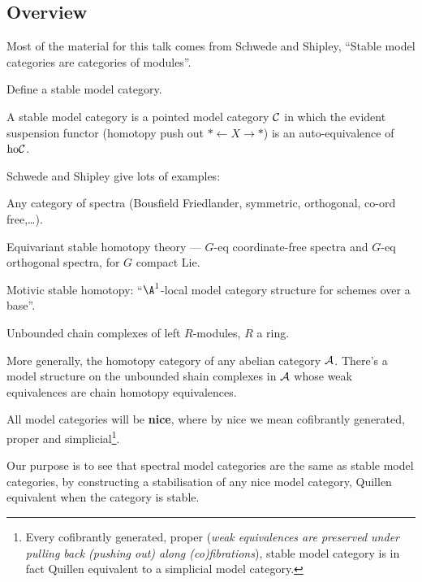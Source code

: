 \begin{MichaelStableModelCats}
\subsection*{Overview}
\begin{itemise}
\item Most of the material for this talk comes from Schwede and Shipley, ``Stable model categories are categories of modules''.
\item Define a stable model category.
\begin{itemise}
\item A stable model category is a pointed model category $\mathcal{C}$ in which the evident suspension functor (homotopy push out $\ast\leftarrow X\rightarrow\ast$) is an auto-equivalence of $\textup{ho}\mathcal{C}$.
\end{itemise}
\item Schwede and Shipley give lots of examples:
\begin{itemise}
\item Any category of spectra (Bousfield Friedlander, symmetric, orthogonal, co-ord free,\ldots).
\item Equivariant stable homotopy theory --- $G$-eq coordinate-free spectra and $G$-eq orthogonal spectra, for $G$ compact Lie.
\item Motivic stable homotopy: ``$\A^1$-local model category structure for schemes over a base''.
\item Unbounded chain complexes of left $R$-modules, $R$ a ring.
\item More generally, the homotopy category of any abelian category $\mathcal{A}$. There's a model structure on the unbounded shain complexes in $\mathcal{A}$ whose weak equivalences are chain homotopy equivalences.
\end{itemise}
\item All model categories will be \textbf{nice}, where by nice we mean cofibrantly generated, proper and simplicial\footnote{Every cofibrantly generated, proper (\textit{weak equivalences are preserved under pulling back (pushing out) along (co)fibrations}), stable model category is in fact Quillen equivalent to a simplicial model category.}. 
\item Our purpose is to see that spectral model categories are the same as stable model categories, by constructing a stabilisation of any nice model category, Quillen equivalent when the category is stable.
\end{itemise}



\end{MichaelStableModelCats}
